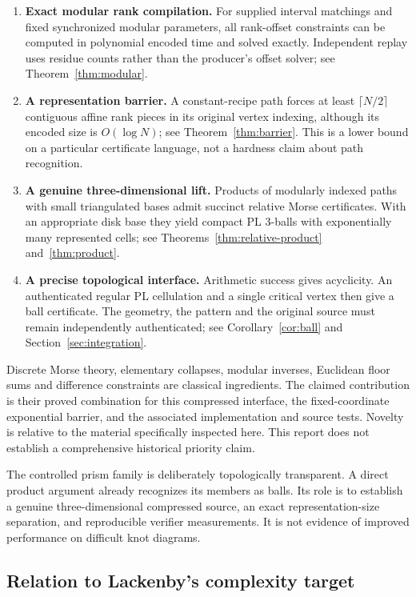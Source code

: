 \documentclass[11pt,letterpaper]{article}
\theoremstyle{definition}
\theoremstyle{remark}\newtheorem{remark}[theorem]{Remark}
\begin{document}
\begin{enumerate}[label=\textbf{\arabic*.},leftmargin=*]
\item \textbf{Exact modular rank compilation.} For supplied interval matchings and fixed synchronized modular parameters, all rank-offset constraints can be computed in polynomial encoded time and solved exactly. Independent replay uses residue counts rather than the producer's offset solver; see Theorem~\ref{thm:modular}.
\item \textbf{A representation barrier.} A constant-recipe path forces at least $\lceil N/2\rceil$ contiguous affine rank pieces in its original vertex indexing, although its encoded size is $O(\log N)$; see Theorem~\ref{thm:barrier}. This is a lower bound on a particular certificate language, not a hardness claim about path recognition.
\item \textbf{A genuine three-dimensional lift.} Products of modularly indexed paths with small triangulated bases admit succinct relative Morse certificates. With an appropriate disk base they yield compact PL 3-balls with exponentially many represented cells; see Theorems~\ref{thm:relative-product} and~\ref{thm:product}.
\item \textbf{A precise topological interface.} Arithmetic success gives acyclicity. An authenticated regular PL cellulation and a single critical vertex then give a ball certificate. The geometry, the pattern and the original source must remain independently authenticated; see Corollary~\ref{cor:ball} and Section~\ref{sec:integration}.
\end{enumerate}

Discrete Morse theory, elementary collapses, modular inverses, Euclidean floor sums and difference constraints are classical ingredients. The claimed contribution is their proved combination for this compressed interface, the fixed-coordinate exponential barrier, and the associated implementation and source tests. Novelty is relative to the material specifically inspected here. This report does not establish a comprehensive historical priority claim.

The controlled prism family is deliberately topologically transparent. A direct product argument already recognizes its members as balls. Its role is to establish a genuine three-dimensional compressed source, an exact representation-size separation, and reproducible verifier measurements. It is not evidence of improved performance on difficult knot diagrams.

\subsection{Relation to Lackenby's complexity target}
\end{document}
